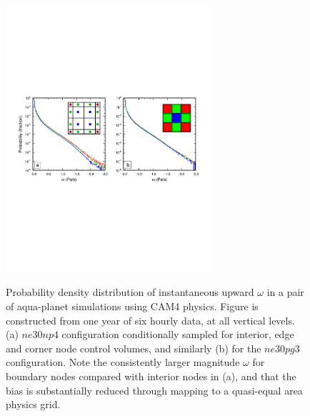 \documentclass[twocol]{ametsoc}
\begin{document}
\begin{figure}[t]
\begin{center}
\noindent\includegraphics[width=18pc,angle=0]{figs/temp_pdf_omg_np4_v_pg3_CROP.pdf}\\
\end{center}
\caption{Probability density distribution of instantaneous upward $\omega$ in a pair of aqua-planet simulations using CAM4 physics. Figure is constructed from one year of six hourly data, at all vertical levels. (a) $ne30np4$ configuration conditionally sampled for interior, edge and corner node control volumes, and similarly (b) for the $ne30pg3$ configuration. Note the consistently larger magnitude $\omega$ for boundary nodes compared with interior nodes in (a), and that the bias is substantially reduced through mapping to a quasi-equal area physics grid.}\label{fig:omega-se-volumes}
\end{figure}
\end{document}
